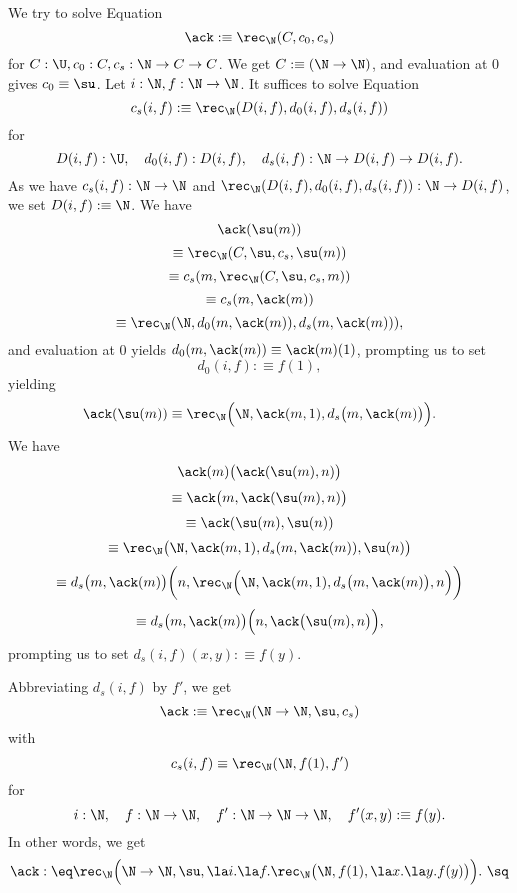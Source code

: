 \documentclass[12pt]{article}
\begin{document}
We try to solve Equation 
\begin{equation}\label{ack1}
\ack:\equiv\rec_\N(C,c_0,c_s)
\end{equation}
for $C:\U,c_0:C,c_s:\N\to C\to C$. We get $C:\equiv(\N\to\N)$, and evaluation at 0 gives $c_0\equiv\su$. Let $i:\N,f:\N\to\N$. It suffices to solve Equation 
\begin{equation}\label{ack2}
c_s(i,f):\equiv\rec_\N(D(i,f),d_0(i,f),d_s(i,f))
\end{equation}
for 
$$
D(i,f):\U,\quad d_0(i,f):D(i,f),\quad d_s(i,f):\N\to D(i,f)\to D(i,f).
$$ 
As we have $c_s(i,f):\N\to\N$ and $\rec_\N(D(i,f),d_0(i,f),d_s(i,f)):\N\to D(i,f)$, we set $D(i,f):\equiv\N$. We have 
%
$$\ack(\su(m))$$
$$\equiv\rec_\N(C,\su,c_s,\su(m))$$
$$\equiv c_s(m,\rec_\N(C,\su,c_s,m))$$
$$\equiv c_s(m,\ack(m))$$
$$\equiv\rec_\N(\N,d_0(m,\ack(m)),d_s(m,\ack(m))),$$
and evaluation at 0 yields $d_0(m,\ack(m))\equiv\ack(m)(1)$, prompting us to set 
$$
d_0(i,f):\equiv f(1),
$$ 
yielding 
$$
\ack(\su(m))\equiv\rec_\N\Big(\N,\ack(m,1),d_s\big(m,\ack(m)\big)\Big).
$$
We have 
$$\ack(m)\big(\ack(\su(m),n)\big)$$ 
$$\equiv\ack\big(m,\ack(\su(m),n)\big)$$ 
$$\equiv\ack(\su(m),\su(n))$$ 
$$\equiv\rec_\N\big(\N,\ack(m,1),d_s(m,\ack(m)),\su(n)\big)$$ 
$$\equiv d_s\big(m,\ack(m)\big)\bigg(n,\rec_\N\Big(\N,\ack(m,1),d_s\big(m,\ack(m)\big),n\Big)\bigg)$$ 
$$\equiv d_s\big(m,\ack(m)\big)\Big(n,\ack\big(\su(m),n\big)\Big),$$
prompting us to set $d_s(i,f)(x,y):\equiv f(y)$. 

Abbreviating $d_s(i,f)$ by $f'$, we get 
$$
\ack:\equiv\rec_\N(\N\to\N,\su,c_s)
$$ 
with 
$$ 
c_s(i,f)\equiv\rec_\N(\N,f(1),f')
$$ 
for 
$$ 
i:\N,\quad f:\N\to\N,\quad f':\N\to\N\to\N,\quad f'(x,y):\equiv f(y).
$$ 
In other words, we get 
$$
\ack:\eq\rec_\N\Big(\N\to\N,\su,\la i.\la f.\rec_\N\big(\N,f(1),\la x.\la y.f(y)\big)\Big).\ \sq
$$ 
\end{document}
